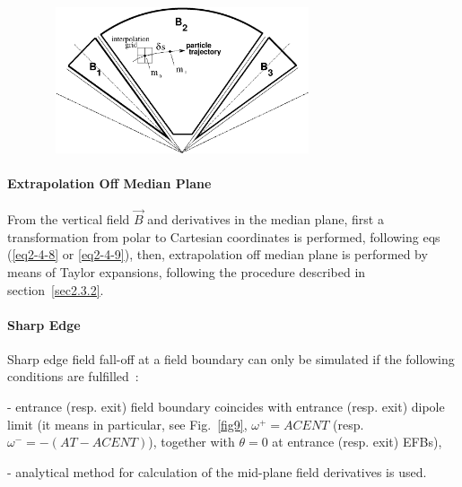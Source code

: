 {\begin{figure}[h]
 \begin{center}
\includegraphics*[bbllx=30,bblly=150,bburx=590,bbury=400,width=8.2cm,height=4.3cm]{grid.eps}
{\setlength{\captionwidth}{12cm}
  }
  \end{center}
\end{figure}


\bigskip

\paragraph{Extrapolation Off Median Plane} 

\noindent From the vertical field $ \vec  B $ and  derivatives in the median plane, 
first a transformation from polar to Cartesian coordinates is 
performed, following eqs (\ref{eq2-4-8} or \ref{eq2-4-9}), then,  extrapolation off median plane is 
performed by means of Taylor expansions, following the procedure described in section~\ref{sec2.3.2}. 




\bigskip

\paragraph{Sharp Edge} 

\noindent Sharp edge field fall-off at a field boundary  can only be simulated if the following conditions are fulfilled~: 

- entrance (resp. exit)  field boundary  coincides with entrance (resp. exit) 
dipole limit (it means in particular, see Fig.~\ref{fig9},  
$\omega^+= ACENT$ (resp. $\omega^- = -(AT-ACENT)$), 
together with $\theta=0$ at entrance (resp. exit) EFBs), 

- analytical method for calculation of the  mid-plane field derivatives is used. 








}
